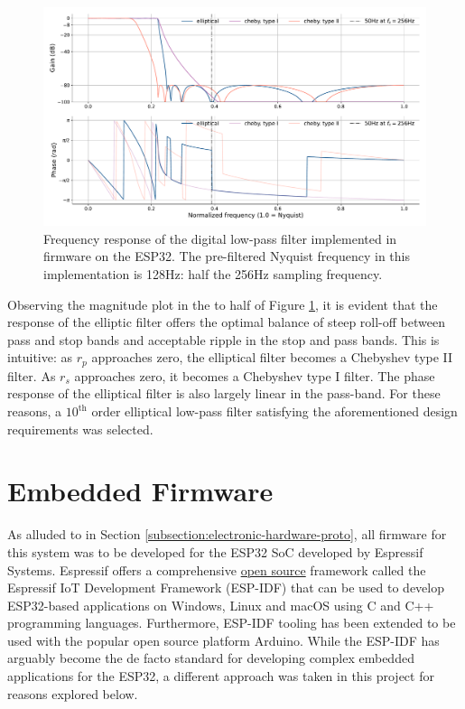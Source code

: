 \begin{figure}[h]
    \centering
    \includegraphics[width=\textwidth]{digital-filt-resp}
    \caption[Frequency response of the digital low-pass filter implemented in firmware on the ESP32]{Frequency response of the digital low-pass filter implemented in firmware on the ESP32. The pre-filtered Nyquist frequency in this implementation is 128Hz: half the 256Hz sampling frequency.}
    \label{fig:digital-filt-resp}
\end{figure}
Observing the magnitude plot in the to half of Figure \ref{fig:digital-filt-resp}, it is evident that the response of the elliptic filter offers the optimal balance of steep roll-off between pass and stop bands and acceptable ripple in the stop and pass bands. This is intuitive: as $r_p$ approaches zero, the elliptical filter becomes a Chebyshev type II filter. As $r_s$ approaches zero, it becomes a Chebyshev type I filter. The phase response of the elliptical filter is also largely linear in the pass-band. For these reasons, a $10^{\textrm{th}}$ order elliptical low-pass filter satisfying the aforementioned design requirements was selected.

\section{Embedded Firmware}
As alluded to in Section \ref{subsection:electronic-hardware-proto}, all firmware for this system was to be developed for the ESP32 SoC developed by Espressif Systems. Espressif offers a comprehensive \href{https://github.com/espressif/esp-idf}{open source} framework called the Espressif IoT Development Framework (ESP-IDF) that can be used to develop ESP32-based applications on Windows, Linux and macOS using C and C++ programming languages. Furthermore, ESP-IDF tooling has been extended to be used with the popular open source platform Arduino. While the ESP-IDF has arguably become the de facto standard for developing complex embedded applications for the ESP32, a different approach was taken in this project for reasons explored below. 

